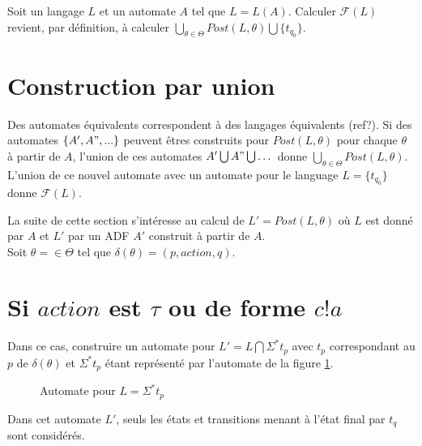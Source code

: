 Soit un langage $L$ et un automate $A$ tel que $L=L(A)$. Calculer $\mathcal{F}(L)$ revient, par définition, à calculer $\bigcup_{\theta\in\Theta}Post(L,\theta)\bigcup \{t_{q_0}\}$.


\section{Construction par union}

Des automates équivalents correspondent à des langages équivalents (ref?). Si des automates $\{A', A", ...\}$ peuvent êtres construits pour $Post(L,\theta)$ pour chaque $\theta$ à partir de $A$, l'union de ces automates $A'\bigcup A"\bigcup\dots$ donne $\bigcup_{\theta\in\Theta}Post(L,\theta)$. L'union de ce nouvel automate avec un automate pour le language $L=\{t_{q_0}\}$ donne $\mathcal{F}(L)$.

La suite de cette section s'intéresse au calcul de $L'= Post(L,\theta)$ où $L$ est donné par $A$ et $L'$ par un ADF $A'$ construit à partir de $A$.\\ 



Soit $\theta=\in\Theta$ tel que $\delta(\theta)=(p,action,q)$.

\section{Si $action$ est $\tau$ ou de forme $c!a$}

Dans ce cas, construire un automate pour $L'=L\bigcap\Sigma^*t_p$ avec $t_p$ correspondant au $p$ de $\delta(\theta)$ et $\Sigma^*t_p$ étant représenté par l'automate de la figure \ref{fig:sigmatq}.

\begin{figure}[H]
    \centering
    \caption{Automate pour $L=\Sigma^*t_p$}\label{fig:sigmatq}
\end{figure}

Dans cet automate $L'$, seuls les états et transitions menant à l'état final par $t_q$ sont considérés.

